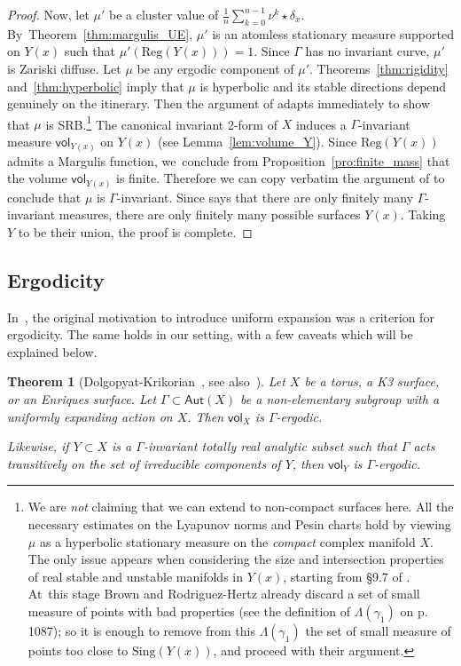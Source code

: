 \documentclass[11pt]{article}
\newcommand{\unsur}[1]{\frac{1}{#1}}
\newcommand{\Sing}{{\mathrm{Sing}}}
\newcommand\Aut{\mathsf{Aut}}
\newcommand{\vol}{{\mathsf{vol}}}
\theoremstyle{plain}
\newtheorem{thm}{Theorem}[section]
\theoremstyle{definition}
\numberwithin{equation}{section}
\begin{document}
\begin{proof}
Now, let $\mu'$ be a cluster value of
$\unsur{n}\sum_{k=0}^{n-1} \nu^k\star\delta_x$. By~Theorem~\ref{thm:margulis_UE}, $\mu'$
is an atomless stationary measure
supported on $Y(x)$ such that $\mu'(\mathrm{Reg}(Y(x)))=1$. Since $\Gamma$ has no invariant
curve, $\mu'$ is Zariski diffuse. Let $\mu$ be any ergodic component of $\mu'$.
Theorems~\ref{thm:rigidity} and~\ref{thm:hyperbolic} imply that $\mu$ is hyperbolic and its stable directions depend genuinely on the itinerary. Then the
argument of \cite[Th.\,3.1]{br} adapts immediately to show that $\mu$ is
SRB.\footnote{We are \emph{not} claiming that we can extend \cite{br} to non-compact surfaces here. All the necessary
estimates on the Lyapunov norms and Pesin charts
hold by viewing $\mu$ as a hyperbolic stationary measure on the
\emph{compact} complex manifold $X$. The only issue appears when considering the size and intersection
properties of real stable and unstable manifolds in $Y(x)$, starting from \S 9.7 of \cite{br}.
At~this stage Brown and Rodriguez-Hertz
already discard a set of small measure of points with bad properties (see the definition of $\Lambda(\gamma_1)$ on p. 1087); so it is enough to remove from this $\Lambda(\gamma_1)$ the set of
small measure of points too close to $\Sing(Y(x))$, and proceed with their argument.} The
canonical invariant 2-form of $X$ induces a $\Gamma$-invariant measure $\vol_{Y(x)}$
on $Y(x)$ (see Lemma~\ref{lem:volume_Y}). Since $\mathrm{Reg}(Y(x))$ admits a Margulis function, we~conclude from
Proposition~\ref{pro:finite_mass} that the volume $\vol_{Y(x)}$ is finite. Therefore we can copy verbatim the
argument of \cite[Th.\,3.4]{br} to conclude that $\mu$ is $\Gamma$-invariant.
Since \cite[Th.\,C]{invariant} says that there are only finitely many $\Gamma$-invariant measures,
there are only finitely many possible surfaces $Y(x)$. Taking $Y$ to be their union,
the proof is complete.
\end{proof}

\subsection{Ergodicity} \label{subs:ergodicity}
In~\cite{dolgopyat-krikorian}, the original motivation to introduce uniform
expansion was a criterion for ergodicity. The same holds in our setting, with a few caveats which will be explained below.

\begin{thm}[{Dolgopyat-Krikorian~\cite[Cor.\,2]{dolgopyat-krikorian}}, see also~\cite{liu_thesis, chung}]
\label{thm:dolgopyat-krikorian}
Let $X$ be a torus, a K3 surface, or an Enriques surface. Let $\Gamma\subset \Aut(X)$ be a
non-elementary subgroup with a uniformly expanding action on $X$. Then $\vol_X$ is $\Gamma$-ergodic.

Likewise, if $Y\subset X$ is a $\Gamma$-invariant totally real
analytic subset such that $\Gamma$ acts transitively on the
set of irreducible components of $Y$, then $\vol_Y$ is $\Gamma$-ergodic.
\end{thm}
\end{document}
